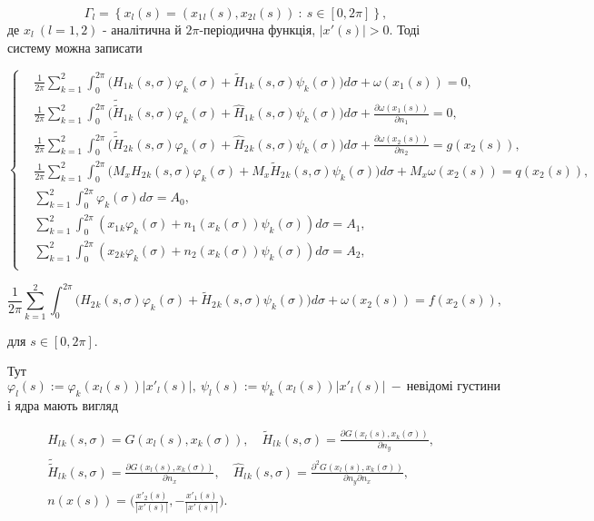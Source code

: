 \documentclass[12pt]{article}
\begin{document}
 \begin{equation}
 	\Gamma_l=\left\{x_l(s)=(x_1{_l}(s),x_2{_l}(s)) \ : \ s\in [0,2\pi]\right\},
  \end{equation}
 де $x_l \ (l=1,2)$ - аналітична й $2\pi$-періодична функція, $|x'(s)|>0.$
 Тоді систему можна записати 
 
 \begin{equation}
 		\left\{
	 	\begin{split}
		\label{paramSystem}
	 		&\frac{1}{2\pi}\sum_{k=1}^{2}\int_{0}^{2\pi}\bigg(H_1{_k}(s, \sigma)\varphi_k(\sigma)+\tilde{H}_1{_k}(s, \sigma)\psi_k(\sigma)\bigg)d\sigma+\omega(x_1(s))=0,\\
			&\frac{1}{2\pi}\sum_{k=1}^{2}\int_{0}^{2\pi}\bigg(\tilde{\tilde{H}}_1{_k}(s, \sigma)\varphi_k(\sigma)+\hat{H}_1{_k}(s, \sigma)\psi_k(\sigma)\bigg)d\sigma+\frac{\partial\omega(x_1(s))}{\partial n_1}=0, \\
			&\frac{1}{2\pi}\sum_{k=1}^{2}\int_{0}^{2\pi}\bigg(\tilde{\tilde{H}}_2{_k}(s, \sigma)\varphi_k(\sigma)+\hat{H}_2{_k}(s, \sigma)\psi_k(\sigma)\bigg)d\sigma+\frac{\partial\omega(x_2(s))}{\partial n_2}=g(x_2(s)), \\
			&\frac{1}{2\pi}\sum_{k=1}^{2}\int_{0}^{2\pi}\bigg(M_x H_2{_k}(s, \sigma)\varphi_k(\sigma)+M_x\tilde{H}_2{_k}(s, \sigma)\psi_k(\sigma)\bigg)d\sigma+M_x\omega(x_2(s))=q(x_2(s)),\\
			&\sum_{k=1}^{2}\int_{0}^{2\pi}\varphi_k(\sigma)d\sigma=A_0, \\
			&\sum_{k=1}^{2}\int_{0}^{2\pi}(x_1{_k}\varphi_k(\sigma)+n_1(x_k(\sigma))\psi_k(\sigma))d\sigma=A_1, \\
			&\sum_{k=1}^{2}\int_{0}^{2\pi}(x_2{_k}\varphi_k(\sigma)+n_2(x_k(\sigma))\psi_k(\sigma))d\sigma=A_2, \\
		\end{split}
		\right.
\end{equation}

 \begin{equation}
	 \frac{1}{2\pi}\sum_{k=1}^{2}\int_{0}^{2\pi}\bigg(H_2{_k}(s, \sigma)\varphi_k(\sigma)+\tilde{H}_2{_k}(s, \sigma)\psi_k(\sigma)\bigg)d\sigma+\omega(x_2(s))=f(x_2(s)), 
\end{equation}

для $s\in [0,2\pi]$.

Тут $ \label{kernels} \varphi_l(s) :=\varphi_k(x_l(s))|x'_l(s)|, \ \psi_l(s) :=\psi_k(x_l(s))|x'_l(s)| \ - \ \textrm{невідомі густини} $ і ядра мають вигляд
 
 \begin{equation}
 \begin{split}
	&H_l{_k}(s, \sigma) = G(x_l(s),x_k(\sigma)), \quad \tilde{H}_l{_k}(s, \sigma)=\frac{\partial G(x_l(s),x_k(\sigma))}{\partial n_y}, \\
	&\tilde{\tilde{H}}_l{_k}(s, \sigma)=\frac{\partial G(x_l(s),x_k(\sigma))}{\partial n_x}, \quad \hat{H}_l{_k}(s, \sigma)=\frac{\partial^2 G(x_l(s),x_k(\sigma))}{\partial n_y\partial n_x}, \\
	&n(x(s))=\Big(\frac{x'_2(s)}{|x'(s)|},-\frac{x'_1(s)}{|x'(s)|}\Big) \nonumber. 
 \end{split}
 \end{equation}
 
\end{document}
